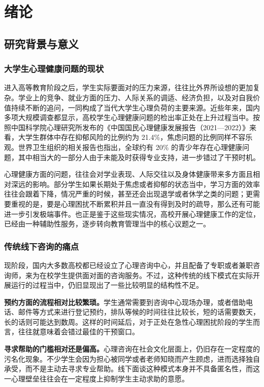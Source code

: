 \chapter{绪论}

\section{研究背景与意义}

\subsection{大学生心理健康问题的现状}

进入高等教育阶段之后，学生实际要面对的压力来源，往往比外界所设想的更加复杂。学业上的竞争、就业方面的压力、人际关系的调适、经济负担，以及对自我价值持续不断的追问，一同构成了当代大学生心理负荷的主要来源。近些年来，国内多项大规模调查都显示，高校学生心理健康问题的检出率正处在上升过程当中。按照中国科学院心理研究所发布的《中国国民心理健康发展报告（2021—2022）》来看，大学生群体中存在抑郁风险的比例约为 21.4\%，焦虑问题的比例同样不容乐观\cite{cass2023}。世界卫生组织的相关报告也指出，全球约有 20\% 的青少年存在心理健康问题，其中相当大的一部分人由于未能及时获得专业支持，进一步错过了干预时机\cite{who2022}。

心理健康方面的问题，往往会对学业表现、人际交往以及身体健康带来多方面且相对深远的影响。部分学生如果长期处于焦虑或者抑郁的状态当中，学习方面的效率往往会跟着下降，情况严重的时候，甚至还会出现退学或者休学之类的问题；更需要重视的是，要是心理困扰不断累积并且一直没有得到及时的疏导，那么还有可能进一步引发极端事件。也正是鉴于这些现实情况，高校开展心理健康工作的定位，已经由一种辅助性服务，逐步转向教育管理当中的核心议题之一。

\subsection{传统线下咨询的痛点}

现阶段，国内大多数高校都已经设立了心理咨询中心，并且配备了专职或者兼职咨询师，来为在校学生提供面对面的咨询服务。不过，这种传统的线下模式在实际开展运行的过程当中，仍旧显现出了一些比较明显的结构性不足。

\textbf{预约方面的流程相对比较繁琐。}学生通常需要到咨询中心现场办理，或者借助电话、邮件等方式来进行登记预约，排队等候的时间往往比较长，短的话需要数天，长的话则可能达到数周。这样的时间延后，对于正处在急性心理困扰阶段的学生而言，往往就意味着会错过最佳的干预窗口。

\textbf{寻求帮助的门槛相对还是偏高。}心理咨询在社会文化层面上，仍旧存在一定程度的污名化现象。不少学生会因为担心被同学或者老师知晓而产生顾虑，进而选择独自承受，而不是主动去寻求专业帮助。线下面谈这种模式本身并不具备匿名性，而这一心理壁垒往往会在一定程度上抑制学生主动求助的意愿\cite{li2017}。

